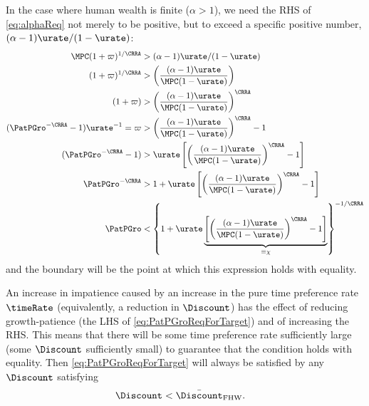 \documentclass{\handout}
\begin{document}
In the case where human wealth is finite ($\alpha > 1$), we need the RHS of \eqref{eq:alphaReq} not merely to be positive, but to exceed a specific positive number, $(\alpha-1)\urate/(1-\urate)$:  
\begin{equation}\begin{gathered}\begin{aligned}
    \MPCU (1+\varpi)^{1/\CRRA} & >  (\alpha-1)\urate/(1-\urate)
\\   (1+\varpi)^{1/\CRRA} & >  \left(\frac{(\alpha-1)\urate}{\MPCU (1-\urate)}\right)
\\   (1+\varpi) & >  \left(\frac{(\alpha-1)\urate}{\MPCU (1-\urate)}\right)^{\CRRA}
\\  (\PatPGro^{-\CRRA}-1)\urate^{-1} = \varpi & >  \left(\frac{(\alpha-1)\urate}{\MPCU (1-\urate)}\right)^{\CRRA}-1
\\  (\PatPGro^{-\CRRA}-1) & >  \urate \left[\left(\frac{(\alpha-1)\urate}{\MPCU (1-\urate)}\right)^{\CRRA}-1\right]
\\  \PatPGro^{-\CRRA} & >  1  + \urate \left[\left(\frac{(\alpha-1)\urate}{\MPCU (1-\urate)}\right)^{\CRRA}-1\right]
\\  \PatPGro & <  \left\{1  + \urate \underbrace{\left[\left(\frac{(\alpha-1)\urate}{\MPCU (1-\urate)}\right)^{\CRRA}-1\right]}_{\equiv \chi} \right\}^{-1/\CRRA} \label{eq:PatPGroReqForTarget}
\end{aligned}\end{gathered}\end{equation}
and the boundary will be the point at which this expression holds with equality.  

An increase in impatience caused by an increase in the pure time preference rate $\timeRate$ (equivalently, a reduction in $\Discount$) has the effect of reducing growth-patience (the LHS of \eqref{eq:PatPGroReqForTarget}) and of increasing the RHS.  This means that there will be some time preference rate sufficiently large (some $\Discount$ sufficiently small) to guarantee that the condition holds with equality.  Then \eqref{eq:PatPGroReqForTarget} will always be satisfied by any $\Discount$ satisfying \providecommand{\DiscountMaxGICWhenFHWCTBSHolds}{\ensuremath{\bar{\Discount}_{\text{FHW}}}}
\begin{equation}\begin{gathered}\begin{aligned}
  \Discount & <  \DiscountMaxGICWhenFHWCTBSHolds \label{eq:DiscountMaxGICWhenFHWCTBSHolds}
.\end{aligned}\end{gathered}\end{equation}
\end{document}
